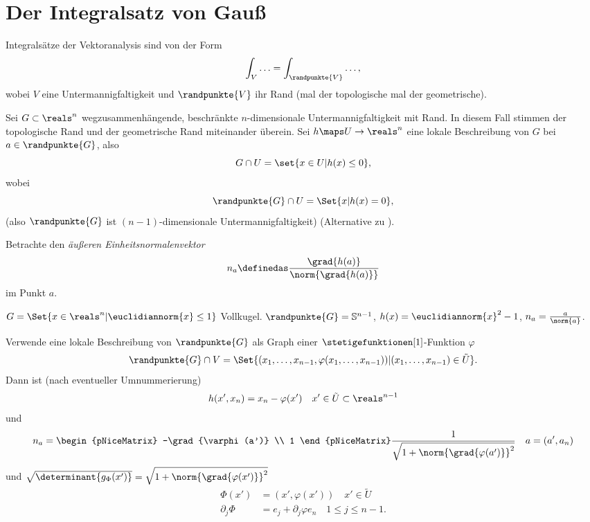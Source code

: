 \section{Der Integralsatz von Gauß}
Integralsätze der Vektoranalysis sind von der Form
\begin{equation*}
  \int_V\dotsc=\int_{\randpunkte{V}}\dotsc,
\end{equation*}
wobei \( V \) \zb eine Untermannigfaltigkeit und \( \randpunkte{V}  \) ihr Rand (mal der topologische mal der geometrische).
\begin{erinnerung*}
  Sei \( G\subset \reals^n \) wegzusammenhängende, beschränkte \( n \)-dimensionale Untermannigfaltigkeit mit Rand. In diesem Fall stimmen der topologische Rand und der geometrische Rand miteinander überein. Sei \( h\maps U\to \reals^n \) eine lokale Beschreibung von \( G \) bei \( a\in \randpunkte{G} \), also 
  \begin{equation*}
    G\cap U=\set{x\in U|h(x)\leq 0},
  \end{equation*}
  wobei
  \begin{equation*}
    \randpunkte{G}\cap U=\Set{x|h(x)=0},
  \end{equation*}
  (also \( \randpunkte{G} \) ist \( (n-1) \)-dimensionale Untermannigfaltigkeit)
  (Alternative zu ).

  Betrachte den \emph{äußeren Einheitsnormalenvektor}
  \begin{equation*}
    n_a\definedas \frac{\grad{h(a)}}{\norm{\grad{h(a)}}}
  \end{equation*}
  im Punkt \( a \).
  \begin{beispiel*}
    \( G=\Set{x\in \reals^n|\euclidiannorm{x}\leq 1} \) Vollkugel. \( \randpunkte{G}=\mathbb{S}^{n-1} \), \( h(x)=\euclidiannorm{x}^2-1 \), \( n_a=\frac{a}{\norm{a}} \).
  \end{beispiel*}
  Verwende eine lokale Beschreibung von \( \randpunkte{G} \) als Graph einer \( \stetigefunktionen[1] \)-Funktion \( \varphi \)
  \begin{equation*}
    \randpunkte{G}\cap V=\Set{(x_1,\dotsc,x_{n-1},\varphi(x_1,\dotsc,x_{n-1}))|(x_1,\dotsc,x_{n-1})\in \tilde{U}}.
  \end{equation*}
  Dann ist (nach eventueller Umnummerierung)
  \begin{equation*}
    h(x',x_n)=x_n-\varphi(x')\quad x'\in \tilde{U}\subset \reals^{n-1 }
  \end{equation*}
  und
  \begin{equation*}
    n_a=\begin{pNiceMatrix} -\grad{\varphi(a')} \\ 1 \end{pNiceMatrix}\frac{1}{\sqrt{1+\norm{\grad{\varphi(a')}}^2}}\quad a=(a',a_n)
  \end{equation*}
  und \( \sqrt{\determinant{g_{\Phi}(x')}}=\sqrt{1+\norm{\grad{\varphi(x')}}^2} \)
  \begin{align*}
    \Phi(x')&=(x',\varphi(x'))\quad x'\in \tilde{U}\\
    \partial_j \Phi&=e_j+\partial_j \varphi e_n\quad 1\leq j\leq n-1.
  \end{align*}
\end{erinnerung*}
